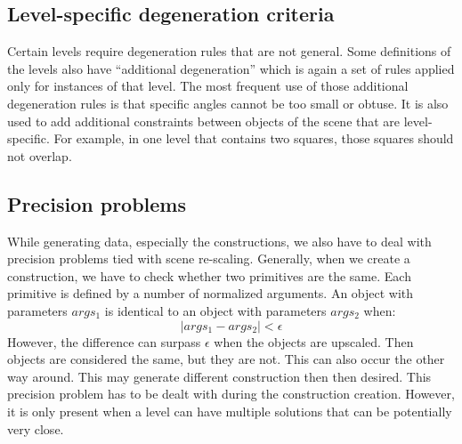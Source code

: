 \subsection{Level-specific degeneration criteria}
Certain levels require degeneration rules that are not general. Some definitions of the levels also have ``additional degeneration'' which is again a set of rules applied only for instances of that level. The most frequent use of those additional degeneration rules is that specific angles cannot be too small or obtuse. It is also used to add additional constraints between objects of the scene that are level-specific. For example, in one level that contains two squares, those squares should not overlap.
\subsection{Precision problems}
While generating data, especially the constructions, we also have to deal with precision problems tied with scene re-scaling.  Generally, when we create a construction, we have to check whether two primitives are the same.  Each primitive is defined by a number of normalized arguments. An object with parameters $args_1$ is identical to an object with parameters $args_2$ when:
\begin{equation}
|args_1 - args_2| < \epsilon
\end{equation}
However, the difference can surpass $\epsilon$ when the objects are upscaled. Then objects are considered the same, but they are not. This can also occur the other way around. This may generate different construction then then desired. This precision problem has to be dealt with during the construction creation. However, it is only present when a level can have multiple solutions that can be potentially very close.
